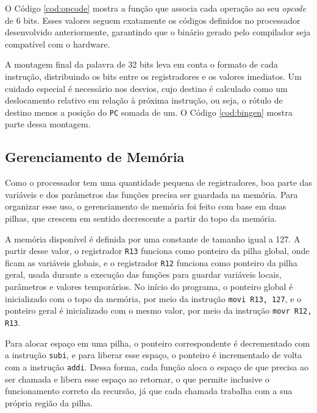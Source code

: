 \documentclass[
	12pt,				%
	oneside,
	a4paper,			%
	english,			%
	french,				%
	spanish,			%
	brazil,				%
	]{abntex2}
\begin{document}
O Código \ref{cod:opcode} mostra a função que associa cada operação ao seu \textit{opcode} de 6 bits. Esses valores seguem exatamente os códigos definidos no processador desenvolvido anteriormente, garantindo que o binário gerado pelo compilador seja compatível com o hardware.



A montagem final da palavra de 32 bits leva em conta o formato de cada instrução, distribuindo os bits entre os registradores e os valores imediatos. Um cuidado especial é necessário nos desvios, cujo destino é calculado como um deslocamento relativo em relação à próxima instrução, ou seja, o rótulo de destino menos a posição do \texttt{PC} somada de um. O Código \ref{cod:bingen} mostra parte dessa montagem.



\subsection{Gerenciamento de Memória}
Como o processador tem uma quantidade pequena de registradores, boa parte das variáveis e dos parâmetros das funções precisa ser guardada na memória. Para organizar esse uso, o gerenciamento de memória foi feito com base em duas pilhas, que crescem em sentido decrescente a partir do topo da memória.

A memória disponível é definida por uma constante de tamanho igual a 127. A partir desse valor, o registrador \texttt{R13} funciona como ponteiro da pilha global, onde ficam as variáveis globais, e o registrador \texttt{R12} funciona como ponteiro da pilha geral, usada durante a execução das funções para guardar variáveis locais, parâmetros e valores temporários. No início do programa, o ponteiro global é inicializado com o topo da memória, por meio da instrução \texttt{movi R13, 127}, e o ponteiro geral é inicializado com o mesmo valor, por meio da instrução \texttt{movr R12, R13}.

Para alocar espaço em uma pilha, o ponteiro correspondente é decrementado com a instrução \texttt{subi}, e para liberar esse espaço, o ponteiro é incrementado de volta com a instrução \texttt{addi}. Dessa forma, cada função aloca o espaço de que precisa ao ser chamada e libera esse espaço ao retornar, o que permite inclusive o funcionamento correto da recursão, já que cada chamada trabalha com a sua própria região da pilha.
\end{document}
